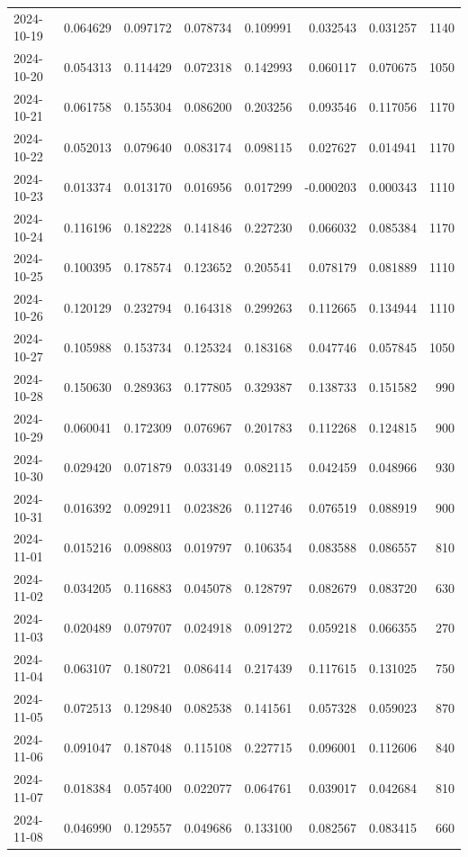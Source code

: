 \begin{tabular}{lrrrrrrr}
2024-10-19 & 0.064629 & 0.097172 & 0.078734 & 0.109991 & 0.032543 & 0.031257 & 1140 \\
2024-10-20 & 0.054313 & 0.114429 & 0.072318 & 0.142993 & 0.060117 & 0.070675 & 1050 \\
2024-10-21 & 0.061758 & 0.155304 & 0.086200 & 0.203256 & 0.093546 & 0.117056 & 1170 \\
2024-10-22 & 0.052013 & 0.079640 & 0.083174 & 0.098115 & 0.027627 & 0.014941 & 1170 \\
2024-10-23 & 0.013374 & 0.013170 & 0.016956 & 0.017299 & -0.000203 & 0.000343 & 1110 \\
2024-10-24 & 0.116196 & 0.182228 & 0.141846 & 0.227230 & 0.066032 & 0.085384 & 1170 \\
2024-10-25 & 0.100395 & 0.178574 & 0.123652 & 0.205541 & 0.078179 & 0.081889 & 1110 \\
2024-10-26 & 0.120129 & 0.232794 & 0.164318 & 0.299263 & 0.112665 & 0.134944 & 1110 \\
2024-10-27 & 0.105988 & 0.153734 & 0.125324 & 0.183168 & 0.047746 & 0.057845 & 1050 \\
2024-10-28 & 0.150630 & 0.289363 & 0.177805 & 0.329387 & 0.138733 & 0.151582 & 990 \\
2024-10-29 & 0.060041 & 0.172309 & 0.076967 & 0.201783 & 0.112268 & 0.124815 & 900 \\
2024-10-30 & 0.029420 & 0.071879 & 0.033149 & 0.082115 & 0.042459 & 0.048966 & 930 \\
2024-10-31 & 0.016392 & 0.092911 & 0.023826 & 0.112746 & 0.076519 & 0.088919 & 900 \\
2024-11-01 & 0.015216 & 0.098803 & 0.019797 & 0.106354 & 0.083588 & 0.086557 & 810 \\
2024-11-02 & 0.034205 & 0.116883 & 0.045078 & 0.128797 & 0.082679 & 0.083720 & 630 \\
2024-11-03 & 0.020489 & 0.079707 & 0.024918 & 0.091272 & 0.059218 & 0.066355 & 270 \\
2024-11-04 & 0.063107 & 0.180721 & 0.086414 & 0.217439 & 0.117615 & 0.131025 & 750 \\
2024-11-05 & 0.072513 & 0.129840 & 0.082538 & 0.141561 & 0.057328 & 0.059023 & 870 \\
2024-11-06 & 0.091047 & 0.187048 & 0.115108 & 0.227715 & 0.096001 & 0.112606 & 840 \\
2024-11-07 & 0.018384 & 0.057400 & 0.022077 & 0.064761 & 0.039017 & 0.042684 & 810 \\
2024-11-08 & 0.046990 & 0.129557 & 0.049686 & 0.133100 & 0.082567 & 0.083415 & 660 \\

\end{tabular}
